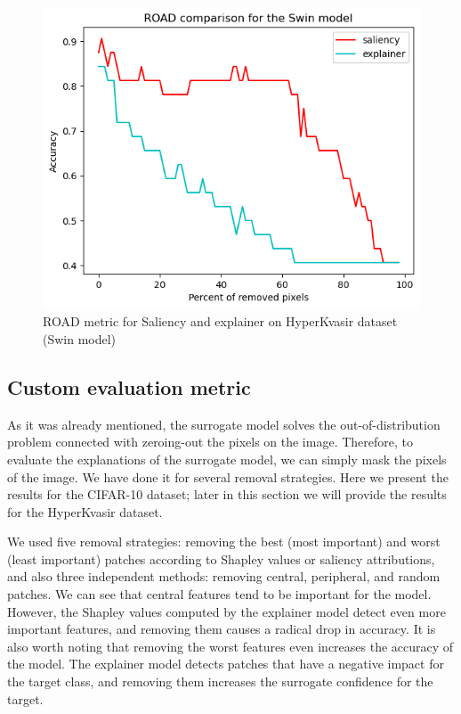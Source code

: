 \documentclass[en]{pracamgr}
\begin{document}
\begin{figure}[H]
\centering
\includegraphics[scale=0.5]{./images/ROAD_gastro_swin.png}
\caption{ROAD metric for Saliency and explainer on HyperKvasir dataset (Swin model)}
\label{ROAD_gastro_swin}
\end{figure}










\subsection{Custom evaluation metric}

As it was already mentioned, the surrogate model solves the out-of-distribution problem connected with zeroing-out the pixels on the image. Therefore, to evaluate the explanations of the surrogate model, we can simply mask the pixels of the image. We have done it for several removal strategies. Here we present the results for the CIFAR-10 dataset; later in this section we will provide the results for the HyperKvasir dataset.




We used five removal strategies: removing the best (most important) and worst (least important) patches according to Shapley values or saliency attributions, and also three independent methods: removing central, peripheral, and random patches. We can see that central features tend to be important for the model. However, the Shapley values computed by the explainer model detect even more important features, and removing them causes a radical drop in accuracy. It is also worth noting that removing the worst features even increases the accuracy of the model. The explainer model detects patches that have a negative impact for the target class, and removing them increases the surrogate confidence for the target.
\end{document}
